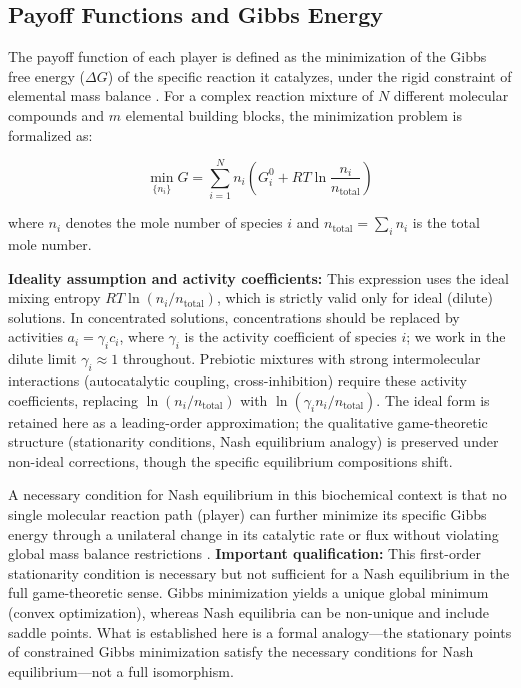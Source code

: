 \documentclass[12pt,a4paper]{article}
\theoremstyle{remark}
\begin{document}
\subsection{Payoff Functions and Gibbs Energy}

The payoff function of each player is defined as the minimization of the Gibbs free energy ($\Delta G$) of the specific reaction it catalyzes, under the rigid constraint of elemental mass balance \citep{MetabolicNash}. For a complex reaction mixture of $N$ different molecular compounds and $m$ elemental building blocks, the minimization problem is formalized as:

\begin{equation}
\min_{\{n_i\}} G = \sum_{i=1}^{N} n_i \left( G_i^0 + RT \ln\frac{n_i}{n_{\mathrm{total}}} \right)
\end{equation}

\noindent
where $n_i$ denotes the mole number of species $i$ and $n_{\mathrm{total}} = \sum_i n_i$ is the total mole number.

\noindent
\textbf{Ideality assumption and activity coefficients:} This expression uses the ideal mixing entropy $RT\ln(n_i/n_{\mathrm{total}})$, which is strictly valid only for ideal (dilute) solutions. In concentrated solutions, concentrations should be replaced by activities $a_i = \gamma_i c_i$, where $\gamma_i$ is the activity coefficient of species $i$; we work in the dilute limit $\gamma_i \approx 1$ throughout. Prebiotic mixtures with strong intermolecular interactions (autocatalytic coupling, cross-inhibition) require these activity coefficients, replacing $\ln(n_i/n_{\mathrm{total}})$ with $\ln(\gamma_i n_i/n_{\mathrm{total}})$. The ideal form is retained here as a leading-order approximation; the qualitative game-theoretic structure (stationarity conditions, Nash equilibrium analogy) is preserved under non-ideal corrections, though the specific equilibrium compositions shift.

A necessary condition for Nash equilibrium in this biochemical context is that no single molecular reaction path (player) can further minimize its specific Gibbs energy through a unilateral change in its catalytic rate or flux without violating global mass balance restrictions \citep{MetabolicNash}. \textbf{Important qualification:} This first-order stationarity condition is necessary but not sufficient for a Nash equilibrium in the full game-theoretic sense. Gibbs minimization yields a unique global minimum (convex optimization), whereas Nash equilibria can be non-unique and include saddle points. What is established here is a formal analogy---the stationary points of constrained Gibbs minimization satisfy the necessary conditions for Nash equilibrium---not a full isomorphism.
\end{document}
